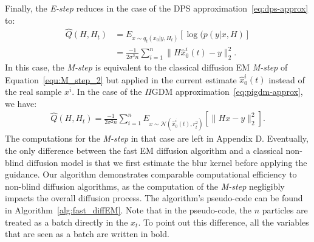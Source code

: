 \documentclass[10pt,twocolumn,letterpaper]{article}
\begin{document}
%
%
\newline
Finally, the \textit{E-step} reduces in the case of the DPS approximation~\eqref{eq:dps-approx} to:
\begin{align}
    \widehat{Q}(H, H_t) & =  E_{x \sim q_t(x_0|y,H_t)}[\log(p(y|x,H)] \\
    \label{eq:Mstep-dps}
    & = \frac{-1}{2\sigma^2 n} \sum_{i=1}^n{\|H\widehat{x}_0^i(t) - y\|_2^2}.
\end{align}
In this case, the \textit{M-step} is equivalent to the classical diffusion EM \textit{M-step} of Equation~\eqref{equ:M_step_2} but applied in the current estimate $\widehat{x}_0^i(t)$ instead of the real sample $x^i$.
In the case of the $\Pi$GDM approximation~\eqref{eq:pigdm-approx}, we have:
\begin{align}
\label{equ:m-step-pigdm}
    \widehat{Q}(H, H_t) = \frac{-1}{2\sigma^2 n}\sum_{i=1}^n{ E_{x \sim \mathcal{N}( \widehat{x}_0^i(t), r_t^2)}[\|Hx-y\|_2^2]}.
\end{align}
The computations for the \textit{M-step} in that case are left in Appendix D.
Eventually, the only difference between the fast EM diffusion algorithm and a classical non-blind diffusion model is that we first estimate the blur kernel before applying the guidance. Our algorithm demonstrates comparable computational efficiency to non-blind diffusion algorithms, as the computation of the \textit{M-step} negligibly impacts the overall diffusion process. The algorithm's pseudo-code can be found in Algorithm~\ref{alg:fast_diffEM}. Note that in the pseudo-code, the $n$ particles are treated as a batch directly in the $x_t$. 
%
To point out this difference, all the variables that are seen as a batch are written in bold.
%
\setlength{\tabcolsep}{0.1 pt}
\end{document}

